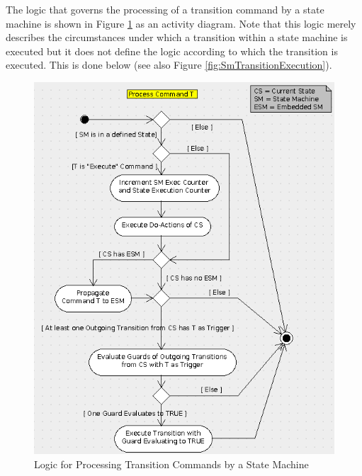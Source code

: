 \documentclass[a4paper,10pt]{article}
\begin{document}
The logic that governs the processing of a transition command by a state machine is shown in
Figure \ref{fig:SmCmdProcessing} as an activity diagram. Note that this logic merely describes the circumstances
under which a transition within a state machine is executed but it does not define the logic
according to which the transition is executed. This is done below (see also Figure \ref{fig:SmTransitionExecution}).

\begin{figure}[ht]
 \centering
 \includegraphics[scale=0.55,keepaspectratio=true]{../images/SM_CmdProcessing.png}
 \caption{Logic for Processing Transition Commands by a State Machine}
 \label{fig:SmCmdProcessing}
\end{figure}
\end{document}
